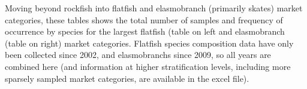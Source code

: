 \documentclass[ xcolor = pdftex, dvipsnames, table ]{beamer}
\begin{document}
\begin{frame}
\begin{minipage}{0.59\textwidth}
\end{minipage}
\end{frame}

%
%

%
\begin{frame}
Moving beyond rockfish into flatfish and elasmobranch (primarily skates) market 
categories, these tables shows the total number of samples and frequency of occurrence 
by species for the largest flatfish (table on left and elasmobranch (table on right) 
market categories.  Flatfish species composition data have only been collected since 
2002, and elasmobranchs since 2009, so all years are combined here (and information at 
higher stratification levels, including more sparsely sampled market categories, are 
available in the excel file). 
\end{frame}

%
%
\end{document}
